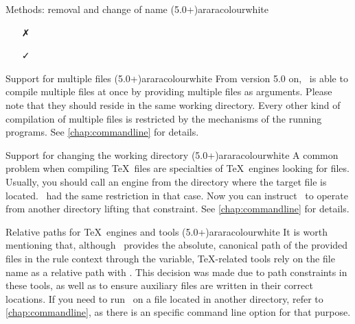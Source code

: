 \begin{messagebox}{Methods: removal and change of name (5.0+)}{araracolour}{\icinfo}{white}
\begin{itemize}
\vspace{1em}

\item[\textcolor{warningcolour}{\faClose}] 

\vspace{.5em}

\hspace{2cm}\textcolor{teal}{\faArrowDown}

\item[\textcolor{okcolour}{\faCheck}]
\end{itemize}
\end{messagebox}

\begin{messagebox}{Support for multiple files (5.0+)}{araracolour}{\icinfo}{white}
From version 5.0 on, \arara\ is able to compile multiple files at once by providing multiple files as arguments. Please note that they should reside in the same working directory. Every other kind of compilation of multiple files is restricted by the mechanisms of the running programs. See \autoref{chap:commandline} for details.
\end{messagebox}

\begin{messagebox}{Support for changing the working directory (5.0+)}{araracolour}{\icinfo}{white}
A common problem when compiling \TeX\ files are specialties of \TeX\ engines looking for files. Usually, you should call an engine from the directory where the target file is located. \arara\ had the same restriction in that case. Now you can instruct \arara\ to operate from another directory lifting that constraint. See \autoref{chap:commandline} for details.
\end{messagebox}

\begin{messagebox}{Relative paths for \TeX\ engines and tools (5.0+)}{araracolour}{\icinfo}{white}
It is worth mentioning that, although \arara\ provides the absolute, canonical path of the provided files in the rule context through the  variable, \TeX-related tools rely on the file name as a relative path with . This decision was made due to path constraints in these tools, as well as to ensure auxiliary files are written in their correct locations. If you need to run \arara\ on a file located in another directory, refer to \autoref{chap:commandline}, as there is an specific command line option for that purpose.
\end{messagebox}

